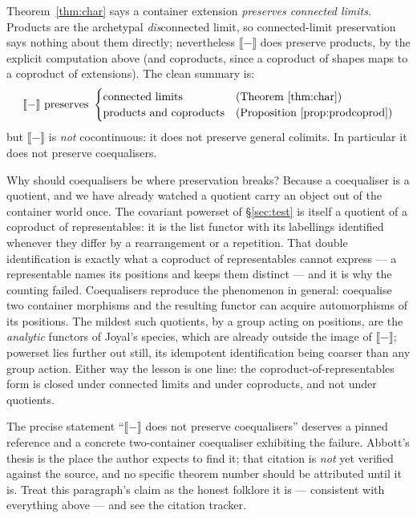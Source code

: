 \documentclass[11pt]{article}
\theoremstyle{plain}
\theoremstyle{definition}
\newcommand{\ext}[1]{\llbracket #1 \rrbracket}
\begin{document}
\begin{warnbox}[What $\ext{-}$ preserves, and where it stops]
Theorem~\ref{thm:char} says a container extension \emph{preserves connected limits}.
Products are the archetypal \emph{dis}connected limit, so connected-limit preservation
says nothing about them directly; nevertheless $\ext{-}$ does preserve products, by the
explicit computation above (and coproducts, since a coproduct of shapes maps to a
coproduct of extensions). The clean summary is:
\[
  \ext{-}\ \text{preserves}\ \begin{cases}
    \text{connected limits} & \text{(Theorem~\ref{thm:char})}\\
    \text{products and coproducts} & \text{(Proposition~\ref{prop:prodcoprod})}
  \end{cases}
\]
but $\ext{-}$ is \emph{not} cocontinuous: it does not preserve general colimits. In
particular it does not preserve coequalisers.
\end{warnbox}

Why should coequalisers be where preservation breaks? Because a coequaliser is a
quotient, and we have already watched a quotient carry an object out of the container
world once. The covariant powerset of \S\ref{sec:test} is itself a quotient of a
coproduct of representables: it is the list functor with its labellings identified
whenever they differ by a rearrangement or a repetition. That double identification is
exactly what a coproduct of representables cannot express --- a representable names its
positions and keeps them distinct --- and it is why the counting failed. Coequalisers
reproduce the phenomenon in general: coequalise two container morphisms and the
resulting functor can acquire automorphisms of its positions. The mildest such
quotients, by a group acting on positions, are the \emph{analytic} functors of Joyal's
species, which are already outside the image of $\ext{-}$; powerset lies further out
still, its idempotent identification being coarser than any group action. Either way
the lesson is one line: the coproduct-of-representables form is closed under connected
limits and under coproducts, and not under quotients.

\begin{warnbox}
The precise statement ``$\ext{-}$ does not preserve coequalisers'' deserves a pinned
reference and a concrete two-container coequaliser exhibiting the failure. Abbott's
thesis is the place the author expects to find it; that citation is \emph{not} yet
verified against the source, and no specific theorem number should be attributed until
it is. Treat this paragraph's claim as the honest folklore it is --- consistent with
everything above --- and see the citation tracker.
\end{warnbox}
\end{document}
